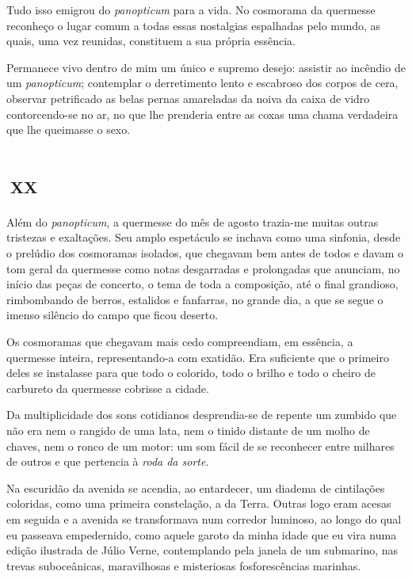 Tudo isso emigrou do \textit{panopticum} para a vida. No cosmorama da quermesse reconheço o lugar comum a todas essas nostalgias espalhadas pelo mundo, as quais, uma vez reunidas, constituem a sua própria essência.

Permanece vivo dentro de mim um único e supremo desejo: assistir ao incêndio de um \textit{panopticum}; contemplar o derretimento lento e escabroso dos corpos de cera, observar petrificado as belas pernas amareladas da noiva da caixa de vidro contorcendo-se no ar, no que lhe prenderia entre as coxas uma chama verdadeira que lhe queimasse o sexo.


\chapter*{\small{}\,\Large\centering\textsc{xx}\,\small{}}

Além do \textit{panopticum}, a quermesse do mês de agosto trazia-me muitas outras tristezas e exaltações. Seu amplo espetáculo se inchava como uma sinfonia, desde o prelúdio dos cosmoramas isolados, que chegavam bem antes de todos e davam o tom geral da quermesse como notas desgarradas e prolongadas que anunciam, no início das peças de concerto, o tema de toda a composição, até o final grandioso, rimbombando de berros, estalidos e fanfarras, no grande dia, a que se segue o imenso silêncio do campo que ficou deserto.

Os cosmoramas que chegavam mais cedo compreendiam, em essência, a quermesse inteira, representando-a com exatidão. Era suficiente que o primeiro deles se instalasse para que todo o colorido, todo o brilho e todo o cheiro de carbureto da quermesse cobrisse a cidade.

Da multiplicidade dos sons cotidianos desprendia-se de repente um zumbido que não era nem o rangido de uma lata, nem o tinido distante de um molho de chaves, nem o ronco de um motor: um som fácil de se reconhecer entre milhares de outros e que pertencia à \textit{roda da sorte}.

Na escuridão da avenida se acendia, ao entardecer, um diadema de cintilações coloridas, como uma primeira constelação, a da Terra. Outras logo eram acesas em seguida e a avenida se transformava num corredor luminoso, ao longo do qual eu passeava empedernido, como aquele garoto da minha idade que eu vira numa edição ilustrada de Júlio Verne, contemplando pela janela de um submarino, nas trevas suboceânicas, maravilhosas e misteriosas fosforescências marinhas.


